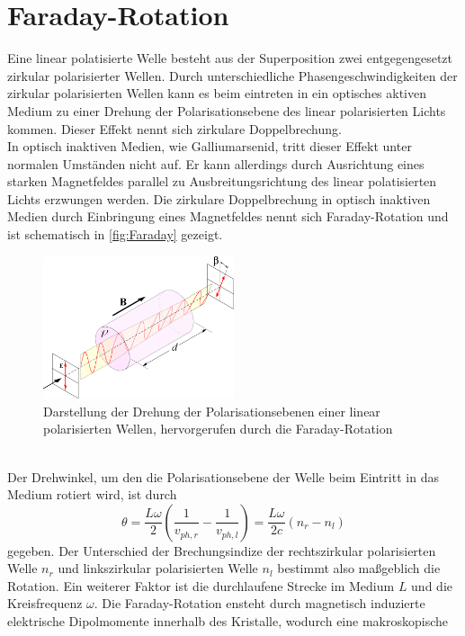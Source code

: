 \section{Faraday-Rotation}

Eine linear polatisierte Welle besteht aus der Superposition zwei entgegengesetzt zirkular polarisierter Wellen. Durch unterschiedliche Phasengeschwindigkeiten der zirkular polarisierten Wellen
kann es beim eintreten in ein optisches aktiven Medium zu einer Drehung der Polarisationsebene des linear polarisierten Lichts kommen. Dieser Effekt nennt sich zirkulare Doppelbrechung.\\
In optisch inaktiven Medien, wie Galliumarsenid, tritt dieser Effekt unter normalen Umständen nicht auf. Er kann allerdings durch Ausrichtung eines starken Magnetfeldes parallel zu Ausbreitungsrichtung des 
linear polatisierten Lichts erzwungen werden. Die zirkulare Doppelbrechung in optisch inaktiven Medien durch Einbringung eines Magnetfeldes nennt sich Faraday-Rotation und ist schematisch in \autoref{fig:Faraday} gezeigt.
\begin{figure}
    \centering
    \includegraphics[width = 0.5\textwidth]{content/V46_pictures/Faraday.png}
    \caption{Darstellung der Drehung der Polarisationsebenen einer linear polarisierten Wellen, hervorgerufen durch die Faraday-Rotation \cite{wiki_Fara}}
    \label{fig:Faraday}
\end{figure}
\\Der Drehwinkel, um den die Polarisationsebene der Welle beim Eintritt in das Medium rotiert wird, ist durch
\begin{equation}
    \label{eq:theta}
    \theta = \frac{L\omega}{2}\left(\frac{1}{v_{ph, r}} - \frac{1}{v_{ph, l}}\right) = \frac{L\omega}{2c}\left(n_r - n_l\right)
\end{equation}
gegeben. Der Unterschied der Brechungsindize der rechtszirkular polarisierten Welle $n_r$ und linkszirkular polarisierten Welle $n_l$ bestimmt also maßgeblich die Rotation. Ein weiterer
Faktor ist die durchlaufene Strecke im Medium $L$ und die Kreisfrequenz $\omega$. Die Faraday-Rotation ensteht durch magnetisch induzierte elektrische Dipolmomente innerhalb des Kristalle, wodurch eine makroskopische
